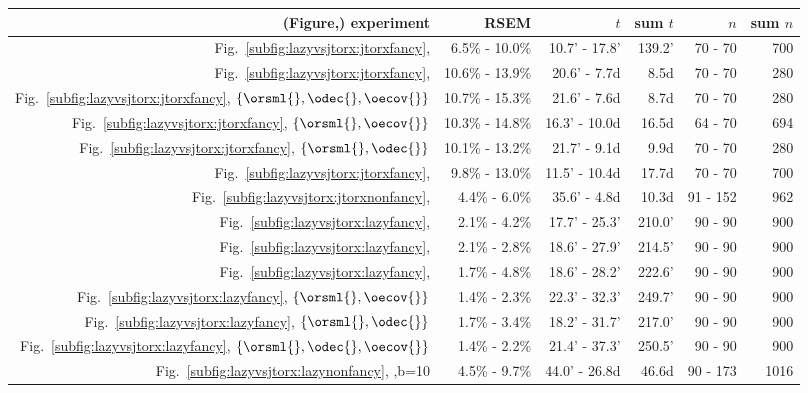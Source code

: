 \begin{tabular}{|r|r|r|r|r|r|}
\hline
(Figure,) experiment&RSEM&$t$&sum $t$&$n$&sum $n$\\\hline
\rowcolor{blue!10}
Fig.~\ref{subfig:lazyvsjtorx:jtorxfancy}, \oecov{} &  6.5\% - 10.0\% &  10.7' - 17.8' &  139.2' &  70 - 70 &  700 \\
Fig.~\ref{subfig:lazyvsjtorx:jtorxfancy}, \odec{} &  10.6\% - 13.9\% &  20.6' - 7.7d &  8.5d &  70 - 70 &  280 \\
\rowcolor{blue!10}
Fig.~\ref{subfig:lazyvsjtorx:jtorxfancy}, $\{\orsml{},\odec{},\oecov{}\}$ &  10.7\% - 15.3\% &  21.6' - 7.6d &  8.7d &  70 - 70 &  280 \\
Fig.~\ref{subfig:lazyvsjtorx:jtorxfancy}, $\{\orsml{},\oecov{}\}$ &  10.3\% - 14.8\% &  16.3' - 10.0d &  16.5d &  64 - 70 &  694 \\
\rowcolor{blue!10}
Fig.~\ref{subfig:lazyvsjtorx:jtorxfancy}, $\{\orsml{},\odec{}\}$ &  10.1\% - 13.2\% &  21.7' - 9.1d &  9.9d &  70 - 70 &  280 \\
Fig.~\ref{subfig:lazyvsjtorx:jtorxfancy}, \orsml{} &  9.8\% - 13.0\% &  11.5' - 10.4d &  17.7d &  70 - 70 &  700 \\
\rowcolor{blue!10}
Fig.~\ref{subfig:lazyvsjtorx:jtorxnonfancy}, \oesisol{} &  4.4\% - 6.0\% &  35.6' - 4.8d &  10.3d &  91 - 152 &  962 \\
\hline
Fig.~\ref{subfig:lazyvsjtorx:lazyfancy}, \orsml{} &  2.1\% - 4.2\% &  17.7' - 25.3' &  210.0' &  90 - 90 &  900 \\
\rowcolor{blue!10}
Fig.~\ref{subfig:lazyvsjtorx:lazyfancy}, \oecov{} &  2.1\% - 2.8\% &  18.6' - 27.9' &  214.5' &  90 - 90 &  900 \\
Fig.~\ref{subfig:lazyvsjtorx:lazyfancy}, \odec{} &  1.7\% - 4.8\% &  18.6' - 28.2' &  222.6' &  90 - 90 &  900 \\
\rowcolor{blue!10}
Fig.~\ref{subfig:lazyvsjtorx:lazyfancy}, $\{\orsml{},\oecov{}\}$ &  1.4\% - 2.3\% &  22.3' - 32.3' &  249.7' &  90 - 90 &  900 \\
Fig.~\ref{subfig:lazyvsjtorx:lazyfancy}, $\{\orsml{},\odec{}\}$ &  1.7\% - 3.4\% &  18.2' - 31.7' &  217.0' &  90 - 90 &  900 \\
\rowcolor{blue!10}
Fig.~\ref{subfig:lazyvsjtorx:lazyfancy}, $\{\orsml{},\odec{},\oecov{}\}$ &  1.4\% - 2.2\% &  21.4' - 37.3' &  250.5' &  90 - 90 &  900 \\
Fig.~\ref{subfig:lazyvsjtorx:lazynonfancy}, \onfrsml{},b=10 &  4.5\% - 9.7\% &  44.0' - 26.8d &  46.6d &  90 - 173 &  1016 \\

\end{tabular}
